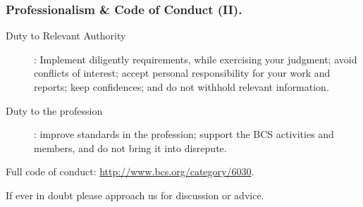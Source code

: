 \documentclass{beamer} %
\begin{document}
\begin{frame}
\frametitle{Professionalism \& Code of Conduct (II).}

\begin{description}
	\item[Duty to Relevant Authority]: Implement diligently requirements, while exercising your judgment; avoid conflicts of interest; accept personal responsibility for your work and reports; keep confidences; and do not withhold relevant information.
	\item[Duty to the profession]: improve standards in the profession; support the BCS activities and members, and do not bring it into disrepute.
\end{description}

\vspace{3mm}
Full code of conduct: \url{http://www.bcs.org/category/6030}.

\vspace{3mm}
If ever in doubt please approach us for discussion or advice.

\end{frame}




\end{document}
